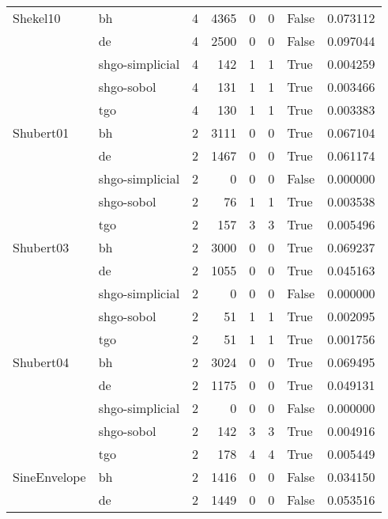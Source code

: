 \begin{longtable}{llrrrrlr}
Shekel10 & bh &     4 &     4365 &      0 &       0 &   False &    0.073112 \\
         & de &     4 &     2500 &      0 &       0 &   False &    0.097044 \\
         & shgo-simplicial &     4 &      142 &      1 &       1 &    True &    0.004259 \\
         & shgo-sobol &     4 &      131 &      1 &       1 &    True &    0.003466 \\
         & tgo &     4 &      130 &      1 &       1 &    True &    0.003383 \\
Shubert01 & bh &     2 &     3111 &      0 &       0 &    True &    0.067104 \\
         & de &     2 &     1467 &      0 &       0 &    True &    0.061174 \\
         & shgo-simplicial &     2 &        0 &      0 &       0 &   False &    0.000000 \\
         & shgo-sobol &     2 &       76 &      1 &       1 &    True &    0.003538 \\
         & tgo &     2 &      157 &      3 &       3 &    True &    0.005496 \\
Shubert03 & bh &     2 &     3000 &      0 &       0 &    True &    0.069237 \\
         & de &     2 &     1055 &      0 &       0 &    True &    0.045163 \\
         & shgo-simplicial &     2 &        0 &      0 &       0 &   False &    0.000000 \\
         & shgo-sobol &     2 &       51 &      1 &       1 &    True &    0.002095 \\
         & tgo &     2 &       51 &      1 &       1 &    True &    0.001756 \\
Shubert04 & bh &     2 &     3024 &      0 &       0 &    True &    0.069495 \\
         & de &     2 &     1175 &      0 &       0 &    True &    0.049131 \\
         & shgo-simplicial &     2 &        0 &      0 &       0 &   False &    0.000000 \\
         & shgo-sobol &     2 &      142 &      3 &       3 &    True &    0.004916 \\
         & tgo &     2 &      178 &      4 &       4 &    True &    0.005449 \\
SineEnvelope & bh &     2 &     1416 &      0 &       0 &   False &    0.034150 \\
         & de &     2 &     1449 &      0 &       0 &   False &    0.053516 \\

\end{longtable}
